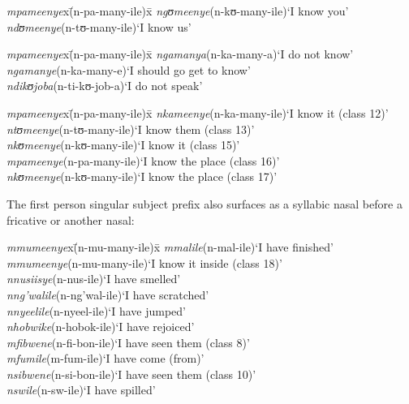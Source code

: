 \begin{exe}
	\ex\label{exSM1SGsnichyllabischvorOMparticipants}
	\begin{tabbing}
		\textit{mpameenye}x\=(\degree n-pa-many-ile)x\=\kill
		\textit{ngʊmeenye}\>(\degree n-kʊ-many-ile)\>`I know you'\\
		\textit{ndʊmeenye}\>(\degree n-tʊ-many-ile)\>`I know us'
	\end{tabbing}

\clearpage

	\ex\label{exSM1SGsnichyllabischvorTMA}
	\begin{tabbing}
		\textit{mpameenye}x\=(\degree n-pa-many-ile)x\=\kill
		\textit{ngamanya}\>(\degree n-ka-many-a)\>`I do not know'\\
		\textit{ngamanye}\>(\degree n-ka-many-e)\>`I should go get to know'\\
		\textit{ndikʊjoba}\>(\degree n-ti-kʊ-job-a)\>`I do not speak'
	\end{tabbing}
	\ex \label{exSM1SGsyllabischvorOMNCL}
	\begin{tabbing}
		\textit{mpameenye}x\=(\degree n-pa-many-ile)x\=\kill
		\textit{nkameenye}\>(\degree n-ka-many-ile)\>`I know it (class 12)'
		\\\textit{ntʊmeenye}\>(\degree n-tʊ-many-ile)\>`I know them (class 13)'
		\\\textit{nkʊmeenye}\>(\degree n-kʊ-many-ile)\>`I know it (class 15)'
		\\\textit{mpameenye}\>(\degree n-pa-many-ile)\>`I know the place (class 16)'
		\\\textit{nkʊmeenye}\>(\degree n-kʊ-many-ile)\>`I know the place (class 17)'
	\end{tabbing}
\end{exe}

\label{MorphophonSM1SG} The first person singular subject prefix also surfaces as a syllabic nasal before a fricative or another nasal:
\begin{exe}
	\ex
	\begin{tabbing}
		\textit{mmumeenye}x\=(\degree n-mu-many-ile)x\=\kill
		\textit{mmalile}\>(\degree n-mal-ile)\>`I have finished' \\
		\textit{mmumeenye}\>(\degree n-mu-many-ile)\>`I know it inside (class 18)' \\
		\textit{nnusiisye}\>(\degree n-nus-ile)\>`I have smelled'\\
		\textit{nng'walile}\>(\degree n-ng'wal-ile)\>`I have scratched'\\
		\textit{nnyeelile}\>(\degree n-nyeel-ile)\>`I have jumped'\\
		\textit{nhobwike}\>(\degree n-hobok-ile)\>`I have rejoiced'\\
		\textit{mfibwene}\>(\degree n-fi-bon-ile)\>`I have seen them (class 8)' \\
		\textit{mfumile}\>(\degree m-fum-ile)\>`I have come (from)' \\
		\textit{nsibwene}\>(\degree n-si-bon-ile)\>`I have seen them (class 10)' \\
		\textit{nswile}\>(\degree n-sw-ile)\>`I have spilled' 
	\end{tabbing}
\end{exe}

